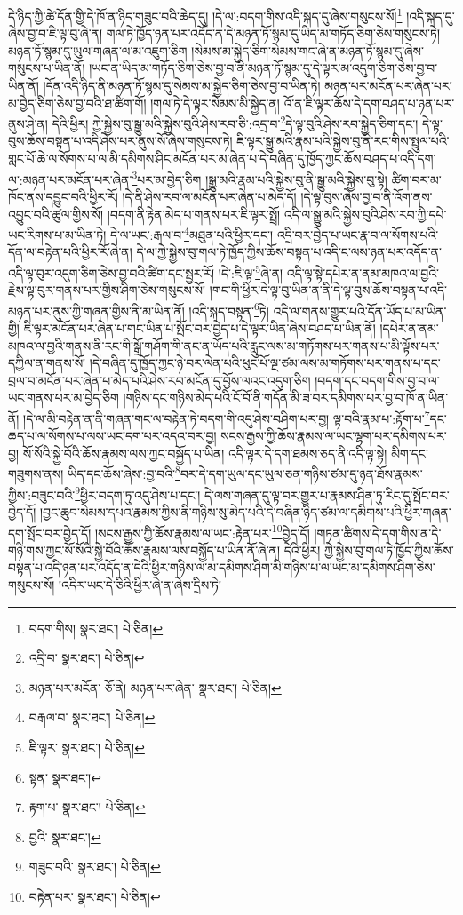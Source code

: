 དེ་ཉིད་ཀྱི་ཚེ་དོན་གྱི་དེ་ཁོ་ན་ཉིད་གཟུང་བའི་ཆེད་དུ། །དེ་ལ་:བདག་གིས་འདི་སྐད་དུ་ཞེས་གསུངས་སོ།\footnote{བདག་གིས།  སྣར་ཐང་།  པེ་ཅིན། } །འདི་སྐད་དུ་ཞེས་བྱ་བ་ཇི་ལྟ་བུ་ཞེ་ན། གལ་ཏེ་ཁྱོད་ཉན་པར་འདོད་ན་དེ་མཉན་ཏོ་སྙམ་དུ་ཡིད་མ་གཏོད་ཅིག་ཅེས་གསུངས་ཏེ། མཉན་ཏོ་སྙམ་དུ་ཡུལ་གཞན་ལ་མ་འཇུག་ཅིག །སེམས་མ་སྐྱེད་ཅིག་སེམས་གང་ཞེ་ན་མཉན་ཏོ་སྙམ་དུ་ཞེས་གསུངས་པ་ཡིན་ནོ། །ཡང་ན་ཡིད་མ་གཏོད་ཅིག་ཅེས་བྱ་བ་ནི་མཉན་ཏོ་སྙམ་དུ་དེ་ལྟར་མ་འདུག་ཅིག་ཅེས་བྱ་བ་ཡིན་ནོ། །དོན་འདི་ཉིད་ནི་མཉན་ཏོ་སྙམ་དུ་སེམས་མ་སྐྱེད་ཅིག་ཅེས་བྱ་བ་ཡིན་ཏེ། མཉན་པར་མངོན་པར་ཞེན་པར་མ་བྱེད་ཅིག་ཅེས་བྱ་བའི་ཐ་ཚིག་གོ། །གལ་ཏེ་དེ་ལྟར་སེམས་མི་སྐྱེད་ན། འོ་ན་ཇི་ལྟར་ཆོས་དེ་དག་བཤད་པ་ཉན་པར་ནུས་ཤེ་ན། དེའི་ཕྱིར། ཀྱེ་སྐྱེས་བུ་སྒྱུ་མའི་སྐྱེས་བུའི་ཤེས་རབ་ཅི་:འདྲ་བ་\footnote{འདྲི་བ་  སྣར་ཐང་།  པེ་ཅིན། }དེ་ལྟ་བུའི་ཤེས་རབ་སྐྱེད་ཅིག་དང་། དེ་ལྟ་བུས་ཆོས་བསྟན་པ་འདི་ཤེས་པར་ནུས་སོ་ཞེས་གསུངས་ཏེ། ཇི་ལྟར་སྒྱུ་མའི་རྣམ་པའི་སྐྱེས་བུ་ནི་རང་གིས་སྤྲུལ་པའི་གླང་པོ་ཆེ་ལ་སོགས་པ་ལ་མི་དམིགས་ཤིང་མངོན་པར་མ་ཞེན་པ་དེ་བཞིན་དུ་ཁྱོད་ཀྱང་ཆོས་བཤད་པ་འདི་དག་ལ་:མཉན་པར་མངོན་པར་ཞེན་\footnote{མཉན་པར་མངོན་  ཅོ་ནེ། མཉན་པར་ཞེན་  སྣར་ཐང་།  པེ་ཅིན། }པར་མ་བྱེད་ཅིག །སྒྱུ་མའི་རྣམ་པའི་སྐྱེས་བུ་ནི་སྒྱུ་མའི་སྐྱེས་བུ་སྟེ། ཚིག་བར་མ་ཁོང་ནས་དབྱུང་བའི་ཕྱིར་རོ། །དེ་ནི་ཤེས་རབ་ལ་མངོན་པར་ཞེན་པ་མེད་དོ། །དེ་ལྟ་བུས་ཞེས་བྱ་བ་ནི་འོག་ནས་འབྱུང་བའི་ཚུལ་གྱིས་སོ། །བདག་ནི་རྟེན་མེད་པ་གནས་པར་ཇི་ལྟར་སྤྲོ། འདི་ལ་སྒྱུ་མའི་སྐྱེས་བུའི་ཤེས་རབ་ཀྱི་དཔེ་ཡང་རིགས་པ་མ་ཡིན་ཏེ། དེ་ལ་ཡང་:རྒལ་བ་\footnote{བརྒལ་བ་  སྣར་ཐང་།  པེ་ཅིན། }མཐུན་པའི་ཕྱིར་དང་། འདྲི་བར་བྱེད་པ་ཡང་རྣ་བ་ལ་སོགས་པའི་དོན་ལ་བརྟེན་པའི་ཕྱིར་རོ་ཞེ་ན། དེ་ལ་ཀྱེ་སྐྱེས་བུ་གལ་ཏེ་ཁྱོད་ཀྱིས་ཆོས་བསྟན་པ་འདི་ང་ལས་ཉན་པར་འདོད་ན་འདི་ལྟ་བུར་འདུག་ཅིག་ཅེས་བྱ་བའི་ཚིག་དང་སྦྱར་རོ། །དེ་:ཇི་ལྟ་\footnote{ཇི་ལྟར་  སྣར་ཐང་།  པེ་ཅིན། }ཞེ་ན། འདི་ལྟ་སྟེ་དཔེར་ན་ནམ་མཁའ་ལ་བྱའི་རྗེས་ལྟ་བུར་གནས་པར་གྱིས་ཤིག་ཅེས་གསུངས་སོ། །གང་གི་ཕྱིར་དེ་ལྟ་བུ་ཡིན་ན་ནི་དེ་ལྟ་བུས་ཆོས་བསྟན་པ་འདི་མཉན་པར་ནུས་ཀྱི་གཞན་གྱིས་ནི་མ་ཡིན་ནོ། །འདི་སྐད་བསྟན་\footnote{སྟན་  སྣར་ཐང་། }ཏེ། འདི་ལ་གནས་གྱུར་པའི་དོན་ཡོད་པ་མ་ཡིན་གྱི། ཇི་ལྟར་མངོན་པར་ཞེན་པ་གང་ཡིན་པ་སྤོང་བར་བྱེད་པ་དེ་ལྟར་ཡིན་ཞེས་བཤད་པ་ཡིན་ནོ། །དཔེར་ན་ནམ་མཁའ་ལ་བྱའི་གནས་ནི་རང་གི་སྒྲོ་གཤོག་གི་ནང་ན་ཡོད་པའི་རླུང་ལས་མ་གཏོགས་པར་གནས་པ་མི་ལྟོས་པར་དཀྱིལ་ན་གནས་སོ། །དེ་བཞིན་དུ་ཁྱོད་ཀྱང་ཉེ་བར་ལེན་པའི་ཕུང་པོ་ལྔ་ཙམ་ལས་མ་གཏོགས་པར་གནས་པ་དང་བྲལ་བ་མངོན་པར་ཞེན་པ་མེད་པའི་ཤེས་རབ་མངོན་དུ་བྱོས་ལའང་འདུག་ཅིག །བདག་དང་བདག་གིས་བྱ་བ་ལ་ཡང་གནས་པར་མ་བྱེད་ཅིག །གཉིས་དང་གཉིས་མེད་པའི་ངོ་བོ་ནི་གདོན་མི་ཟ་བར་དམིགས་པར་བྱ་བ་ཁོ་ན་ཡིན་ནོ། །དེ་ལ་མི་བརྟེན་ན་ནི་གཞན་གང་ལ་བརྟེན་ཏེ་བདག་གི་འདུ་ཤེས་བཤིག་པར་བྱ། ལྟ་བའི་རྣམ་པ་:རྟོག་པ་\footnote{རྟག་པ་  སྣར་ཐང་།  པེ་ཅིན། }དང་ཆད་པ་ལ་སོགས་པ་ལས་ཡང་དག་པར་འདའ་བར་བྱ། སངས་རྒྱས་ཀྱི་ཆོས་རྣམས་ལ་ཡང་ལྷག་པར་དམིགས་པར་བྱ། སོ་སོའི་སྐྱེ་བོའི་ཆོས་རྣམས་ལས་ཀྱང་བསྐྱོད་པ་ཡིན། འདི་ལྟར་དེ་དག་ཐམས་ཅད་ནི་འདི་ལྟ་སྟེ། མིག་དང་གཟུགས་ནས། ཡིད་དང་ཆོས་ཞེས་:བྱ་བའི་\footnote{བྱའི་  སྣར་ཐང་། }བར་དེ་དག་ཡུལ་དང་ཡུལ་ཅན་གཉིས་ཙམ་དུ་ཉན་ཐོས་རྣམས་ཀྱིས་:བཟུང་བའི་\footnote{གཟུང་བའི་  སྣར་ཐང་།  པེ་ཅིན། }ཕྱིར་བདག་ཏུ་འདུ་ཤེས་པ་དང་། དེ་ལས་གཞན་དུ་ལྟ་བར་གྱུར་པ་རྣམས་ཤིན་ཏུ་རིང་དུ་སྤོང་བར་བྱེད་དོ། །བྱང་ཆུབ་སེམས་དཔའ་རྣམས་ཀྱིས་ནི་གཉིས་སུ་མེད་པའི་དེ་བཞིན་ཉིད་ཙམ་ལ་དམིགས་པའི་ཕྱིར་གཞན་དག་སྤོང་བར་བྱེད་དོ། །སངས་རྒྱས་ཀྱི་ཆོས་རྣམས་ལ་ཡང་:རྟེན་པར་\footnote{བརྟེན་པར་  སྣར་ཐང་།  པེ་ཅིན། }བྱེད་དོ། །གཏན་ཚིགས་དེ་དག་གིས་ན་དེ་གཉི་གས་ཀྱང་སོ་སོའི་སྐྱེ་བོའི་ཆོས་རྣམས་ལས་བསྐྱོད་པ་ཡིན་ནོ་ཞེ་ན། དེའི་ཕྱིར། ཀྱེ་སྐྱེས་བུ་གལ་ཏེ་ཁྱོད་ཀྱིས་ཆོས་བསྟན་པ་འདི་ཉན་པར་འདོད་ན་དེའི་ཕྱིར་གཉིས་ལ་མ་དམིགས་ཤིག་མི་གཉིས་པ་ལ་ཡང་མ་དམིགས་ཤིག་ཅེས་གསུངས་སོ། །འདིར་ཡང་དེ་ཅིའི་ཕྱིར་ཞེ་ན་ཞེས་དྲིས་ཏེ། 